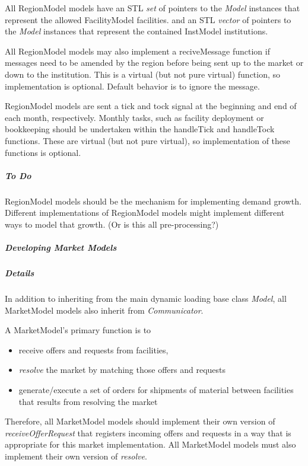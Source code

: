 \documentclass[letterpaper,10pt,english]{sphinxmanual}
\begin{document}
All RegionModel models have an STL \emph{set} of pointers to the \emph{Model} instances
that represent the allowed FacilityModel facilities. and an STL \emph{vector} of
pointers to the \emph{Model} instances that represent the contained InstModel
institutions.

All RegionModel models may also implement a reciveMessage function if messages
need to be amended by the region before being sent up to the market or down to
the institution. This is a virtual (but not pure virtual) function, so
implementation is optional. Default behavior is to ignore the message.

RegionModel models are sent a tick and tock signal at the beginning and end of
each month, respectively. Monthly tasks, such as facility deployment or
bookkeeping should be undertaken within the handleTick and handleTock
functions. These are virtual (but not pure virtual), so implementation of these
functions is optional.


\subparagraph{To Do}
\label{devdoc/make-models/region:to-do}
RegionModel models should be the mechanism for implementing demand growth.
Different implementations of RegionModel models might implement different ways
to model that growth. (Or is this all pre-processing?)


\subparagraph{Developing Market Models}
\label{devdoc/make-models/market::doc}\label{devdoc/make-models/market:developing-market-models}

\subparagraph{Details}
\label{devdoc/make-models/market:details}
In addition to inheriting from the main dynamic loading base class \emph{Model}, all
MarketModel models also inherit from \emph{Communicator}.

A MarketModel's primary function is to
\begin{itemize}
\item {} 
receive offers and requests from facilities,

\item {} 
\emph{resolve} the market by matching those offers and requests

\item {} 
generate/execute a set of orders for shipments of material between
facilities that results from resolving the market

\end{itemize}

Therefore, all MarketModel models should implement their own version of
\emph{receiveOfferRequest} that registers incoming offers and requests in a way that
is appropriate for this market implementation.  All MarketModel models must
also implement their own version of \emph{resolve}.
\end{document}
